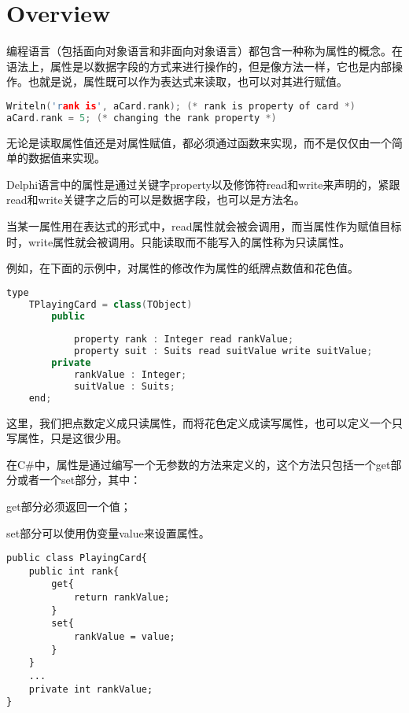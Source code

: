 \section{Overview}

编程语言（包括面向对象语言和非面向对象语言）都包含一种称为属性的概念。在语法上，属性是以数据字段的方式来进行操作的，但是像方法一样，它也是内部操作。也就是说，属性既可以作为表达式来读取，也可以对其进行赋值。




\begin{lstlisting}[language=C++]
Writeln('rank is', aCard.rank); (* rank is property of card *)
aCard.rank = 5; (* changing the rank property *)
\end{lstlisting}

无论是读取属性值还是对属性赋值，都必须通过函数来实现，而不是仅仅由一个简单的数据值来实现。

Delphi语言中的属性是通过关键字property以及修饰符read和write来声明的，紧跟read和write关键字之后的可以是数据字段，也可以是方法名。

当某一属性用在表达式的形式中，read属性就会被会调用，而当属性作为赋值目标时，write属性就会被调用。只能读取而不能写入的属性称为只读属性。

例如，在下面的示例中，对属性的修改作为属性的纸牌点数值和花色值。







\begin{lstlisting}[language=C++]
type
	TPlayingCard = class(TObject)
		public
				
			property rank : Integer read rankValue;
			property suit : Suits read suitValue write suitValue;
		private
			rankValue : Integer;
			suitValue : Suits;
	end;
\end{lstlisting}

这里，我们把点数定义成只读属性，而将花色定义成读写属性，也可以定义一个只写属性，只是这很少用。


在C\#中，属性是通过编写一个无参数的方法来定义的，这个方法只包括一个get部分或者一个set部分，其中：

\begin{compactitem}
\item get部分必须返回一个值；
\item set部分可以使用伪变量value来设置属性。
\end{compactitem}

\begin{lstlisting}[language={[Sharp]C}]
public class PlayingCard{
	public int rank{
		get{
			return rankValue;
		}
		set{
			rankValue = value;
		}
	}
	...
	private int rankValue;
}
\end{lstlisting}

